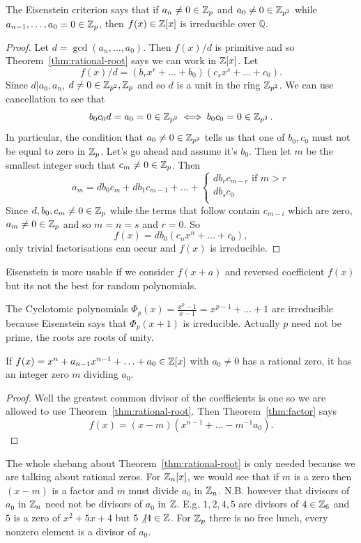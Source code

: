 \begin{theorem}
The Eisenstein criterion says that if $a_n \neq 0 \in \operatorname{\mathbb{Z}}_p$ and $a_0 \neq 0 \in \operatorname{\mathbb{Z}}_{p^2}$
while $a_{n-1},\hdots,a_0 = 0 \in \operatorname{\mathbb{Z}}_p$, then $f(x) \in \operatorname{\mathbb{Z}}[x]$ is irreducible over $\mathbb{Q}$.
\end{theorem}
\begin{proof}
Let $d = \gcd(a_n,\hdots,a_0)$. Then $f(x) \slash d$ is primitive and so Theorem~\ref{thm:rational-root} says we can work in $\operatorname{\mathbb{Z}}[x]$.
Let $$
f(x) \slash d = (b_rx^r+\hdots+b_0)(c_sx^s+\hdots+c_0).
$$
Since $d \vert a_0,a_n$, $d \neq 0 \in \operatorname{\mathbb{Z}}_{p^2}, \operatorname{\mathbb{Z}}_p$ and so $d$ is a unit in the ring $\operatorname{\mathbb{Z}}_{p^2}$.
We can use cancellation to see that $$b_0c_0d = a_0 = 0 \in \operatorname{\mathbb{Z}}_{p^2} \iff b_0c_0 = 0 \in \operatorname{\mathbb{Z}}_{p^2}.$$
In particular, the condition that $a_0 \neq 0 \in \operatorname{\mathbb{Z}}_{p^2}$ tells us that one of $b_0,c_0$ must not be equal to zero in $\operatorname{\mathbb{Z}}_{p}$. Let's go ahead and assume it's $b_0$.
Then let $m$ be the smallest integer such that $c_m \neq 0 \in \operatorname{\mathbb{Z}}_p$.
Then $$
a_m = db_0c_m + db_1c_{m-1} + \hdots +
\begin{cases}
db_r c_{m-r} \text{ if $m > r$} \\
db_{s}c_{0} \\
\end{cases}
$$
Since $d,b_0,c_m \neq 0 \in \operatorname{\mathbb{Z}}_p$ while the terms that follow contain $c_{m-i}$ which are zero, $a_m \neq 0 \in \operatorname{\mathbb{Z}}_p$ and so $m=n=s$ and $r=0$. So $$
f(x) = db_0 (c_nx^n+\hdots+c_0),
$$
only trivial factorisations can occur and $f(x)$ is irreducible.
\end{proof}
Eisenstein is more usable if we consider $f(x+a)$ and reversed coefficient $f(x)$ but its not the best for random polynomials.
\begin{cor}
The Cyclotomic polynomials $\Phi_p(x) = \frac{x^p-1}{x-1} = x^{p-1} + \hdots + 1$ are irreducible because Eisenstein says that $\Phi_p(x+1)$ is irreducible. Actually $p$ need not be prime, the roots are roots of unity.
\end{cor}
\begin{theorem}
If $f(x) = x^n + a_{n-1}x^{n-1}+\hdots + a_0 \in \operatorname{\mathbb{Z}}[x]$ with $a_0 \neq 0$ has a rational zero,
it has an integer zero $m$ dividing $a_0$.
\end{theorem}
\begin{proof}
Well the greatest common divisor of the coefficients is one so we are allowed to use
Theorem~\ref{thm:rational-root}. Then Theorem~\ref{thm:factor} says
$$
f(x) = (x-m)(x^{n-1}+\hdots-m^{-1}a_0).
$$
\end{proof}
The whole shebang about Theorem~\ref{thm:rational-root} is only needed because we are talking about rational zeros.
For $\operatorname{\mathbb{Z}}_n[x]$, we would see that if $m$ is a zero then $(x-m)$ is a factor and
$m$ must divide $a_0$ in $\operatorname{\mathbb{Z}}_n$. N.B.
however that divisors of $a_0$ in $\operatorname{\mathbb{Z}}_n$ need not be divisors of $a_0$ in $\operatorname{\mathbb{Z}}$.
E.g. $1,2,4,5$ are divisors of $4 \in \operatorname{\mathbb{Z}}_6$ and $5$
is a zero of $x^2+5x+4$ but $5 \not \vert 4 \in \operatorname{\mathbb{Z}}$. For $\operatorname{\mathbb{Z}}_p$ there is no free lunch, every nonzero element is a divisor of $a_0$.

